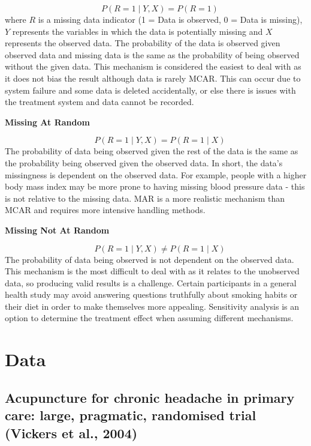 \documentclass{article}
\begin{document}
\[\quad P(R = 1 \mid Y, X) = P(R = 1)\] where \(R\) is a missing data
indicator (1 = Data is observed, 0 = Data is missing), \(Y\) represents
the variables in which the data is potentially missing and \(X\)
represents the observed data. The probability of the data is observed
given observed data and missing data is the same as the probability of
being observed without the given data. This mechanism is considered the
easiest to deal with as it does not bias the result although data is
rarely MCAR. This can occur due to system failure and some data is
deleted accidentally, or else there is issues with the treatment system
and data cannot be recorded.

\textbf{Missing At Random}

\[\quad P(R = 1 \mid Y, X) = P(R = 1 \mid X)\] The probability of data
being observed given the rest of the data is the same as the probability
being observed given the observed data. In short, the data's missingness
is dependent on the observed data. For example, people with a higher
body mass index may be more prone to having missing blood pressure data
- this is not relative to the missing data. MAR is a more realistic
mechanism than MCAR and requires more intensive handling methods.

\textbf{Missing Not At Random}

\[\quad P(R = 1 \mid Y, X) \ne P(R = 1 \mid X)\] The probability of data
being observed is not dependent on the observed data. This mechanism is
the most difficult to deal with as it relates to the unobserved data, so
producing valid results is a challenge. Certain participants in a
general health study may avoid answering questions truthfully about
smoking habits or their diet in order to make themselves more appealing.
Sensitivity analysis is an option to determine the treatment effect when
assuming different mechanisms.

\section{Data}\label{data}

\subsection{Acupuncture for chronic headache in primary care: large,
pragmatic, randomised trial (Vickers et al.,
2004)}\label{acupuncture-for-chronic-headache-in-primary-care-large-pragmatic-randomised-trial-vickers-et-al.-2004}
\end{document}

